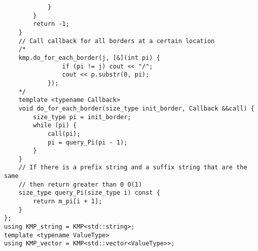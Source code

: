 \begin{lstlisting}
            }
        }
        return -1;
    }
    // Call callback for all borders at a certain location
    /*
    kmp.do_for_each_border(j, [&](int pi) {
                if (pi != j) cout << "/";
                cout << p.substr(0, pi);
            });
    */
    template <typename Callback>
    void do_for_each_border(size_type init_border, Callback &&call) {
        size_type pi = init_border;
        while (pi) {
            call(pi);
            pi = query_Pi(pi - 1);
        }
    }
    // If there is a prefix string and a suffix string that are the same
    // then return greater than 0 O(1)
    size_type query_Pi(size_type i) const { 
        return m_pi[i + 1];
    }
};
using KMP_string = KMP<std::string>;
template <typename ValueType>
using KMP_vector = KMP<std::vector<ValueType>>;
\end{lstlisting}

